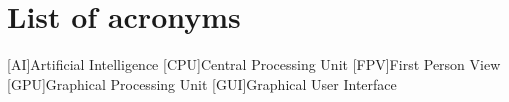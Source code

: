 \chapter*{List of acronyms}
\begin{acronym} 
    [AI]{Artificial Intelligence}
    [CPU]{Central Processing Unit}
    [FPV]{First Person View}
    [GPU]{Graphical Processing Unit}
    [GUI]{Graphical User Interface}
\end{acronym}